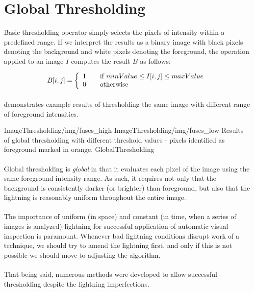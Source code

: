 \section{Global Thresholding}

\paragraph*{}
Basic thresholding operator simply selects the pixels of intensity within a predefined range. If we interpret the results as a binary image with black pixels denoting the background and white pixels denoting the foreground, the operation applied to an image $I$ computes the result $B$ as follows:

\[
B[i,j] = \left\{ 
  \begin{array}{l l}
    1 & \quad \text{if } minValue \leq I[i,j] \leq maxValue \\
    0 & \quad \text{otherwise} \\
  \end{array} \right.
\]

\paragraph*{}
 demonstrates example results of thresholding the same image with different range of foreground intensities.

\twoFigures
{ImageThresholding/img/fuses_high}
{ImageThresholding/img/fuses_low}
{Results of global thresholding with different threshold values - pixels identified as foreground marked in orange.}
{GlobalThresholding}
{\basicWidth}

\paragraph*{}
Global thresholding is \textit{global} in that it evaluates each pixel of the image using the same foreground intensity range. As such, it requires not only that the background is consistently darker (or brighter) than foreground, but also that the lightning is reasonably uniform throughout the entire image.

\paragraph*{}
The importance of uniform (in space) and constant (in time, when a series of images is analyzed) lightning for successful application of automatic visual inspection is paramount. Whenever bad lightning conditions disrupt work of a technique, we should try to amend the lightning first, and only if this is not possible we should move to adjusting the algorithm. 

\paragraph*{}
That being said, numerous methods were developed to allow successful thresholding despite the lightning imperfections.
